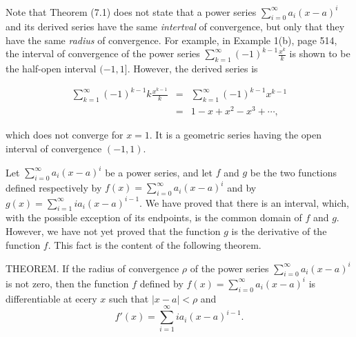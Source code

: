 Note that Theorem (7.1) does not state that a power series $\sum_{i=0}^\infty a_{i}(x-a)^i$ and its derived series have the same \textit{intertval} of convergence, but only that they have the same \textit{radius} of convergence. For example, in Example 1(b), page 514, the interval of convergence of the power series $\sum_{k=1}^\infty (-1)^{k-1} \frac{x^k}{k}$ is shown to be the half-open interval $(-1,1]$. However, the derived series is

\begin{eqnarray*}
\sum_{k=1}^\infty (-1)^{k-1} k \frac{x^{k-1}}{k} 
&=& \sum_{k=1}^\infty ( -1)^{k-1} x^{k-1} \\
&=& 1 - x + x^2 - x^3 + \cdots ,
\end{eqnarray*}

\noindent which does not converge for $x = 1$. It is a geometric series having the open interval of convergence $(-1, 1)$.

Let $\sum_{i=0}^\infty a_{i}(x-a)^i$ be a power series, and let $f$ and $g$ be the two functions defined respectively by $f(x) = \sum_{i=0}^\infty a_{i}(x-a)^i$ and by $g(x) = \sum_{i=1}^\infty ia_{i}(x -a)^{i-1}$. We have proved that there is an interval, which, with the
possible exception of its endpoints, is the common domain of $f$ and $g$. However, we have not yet proved that the function $g$ is the derivative of the function $f$. This fact is the content of the following theorem.


\begin{theorem} THEOREM. If the radius of convergence $\rho$ of the power series $\sum_{i=0}^\infty a_i (x-a)^i$ is not zero, then the function $f$ defined by $f(x) = \sum_{i=0}^\infty a_i(x-a)^i$ is differentiable at ecery $x$ such that $|x-a| < \rho$ and
$$
 f'(x) = \sum_{i=1}^\infty ia_i(x-a)^{i-1}.
$$
\end{theorem}

